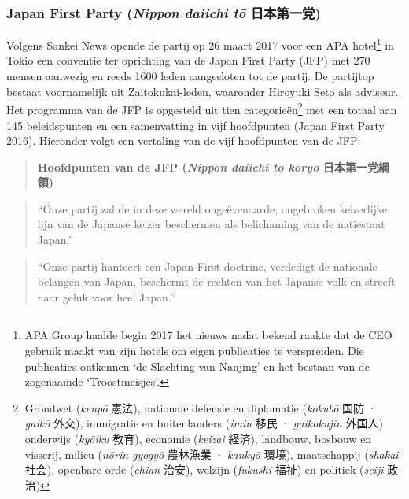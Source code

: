 \documentclass[10.5pt,dutch,]{article}
\begin{document}
\subsubsection{\texorpdfstring{Japan First Party (\emph{Nippon daiichi
tō}
日本第一党)}{Japan First Party (Nippon daiichi tō 日本第一党)}}\label{japan-first-party-nippon-daiichi-tux14d-ux65e5ux672cux7b2cux4e00ux515a}

Volgens Sankei News opende de partij op 26 maart 2017 voor een APA
hotel\footnote{APA Group haalde begin 2017 het nieuws nadat bekend
  raakte dat de CEO gebruik maakt van zijn hotels om eigen publicaties
  te verspreiden. Die publicaties ontkennen `de Slachting van Nanjing'
  en het bestaan van de zogenaamde `Troostmeisjes'.} in Tokio een
conventie ter oprichting van de Japan First Party (JFP) met 270 mensen
aanwezig en reeds 1600 leden aangesloten tot de partij. De partijtop
bestaat voornamelijk uit Zaitokukai-leden, waaronder Hiroyuki Seto als
adviseur. Het programma van de JFP is opgesteld uit tien
categorieën\footnote{Grondwet (\emph{kenpō} 憲法), nationale defensie en
  diplomatie (\emph{kokubō} 国防 · \emph{gaikō} 外交), immigratie en
  buitenlanders (\emph{imin} 移民 · \emph{gaikokujin} 外国人) onderwijs
  (\emph{kyōiku} 教育), economie (\emph{keizai} 経済), landbouw, bosbouw
  en visserij, milieu (\emph{nōrin gyogyō} 農林漁業 · \emph{kankyō}
  環境), maatschappij (\emph{shakai} 社会), openbare orde (\emph{chian}
  治安), welzijn (\emph{fukushi} 福祉) en politiek (\emph{seiji} 政治)}
met een totaal aan 145 beleidspunten en een samenvatting in vijf
hoofdpunten (Japan First Party
\protect\hyperlink{ref-japanux5ffirstux5fpartyux5fjapanux5f2016}{2016}).
Hieronder volgt een vertaling van de vijf hoofdpunten van de JFP:

\begin{quote}
\textbf{Hoofdpunten van de JFP (\emph{Nippon daiichi tō kōryō}
日本第一党綱領)}
\end{quote}

\begin{quote}
``Onze partij zal de in deze wereld ongeëvenaarde, ongebroken
keizerlijke lijn van de Japanse keizer beschermen als belichaming van de
natiestaat Japan.''
\end{quote}

\begin{quote}
``Onze partij hanteert een Japan First doctrine, verdedigt de nationale
belangen van Japan, beschermt de rechten van het Japanse volk en streeft
naar geluk voor heel Japan.''
\end{quote}
\end{document}
